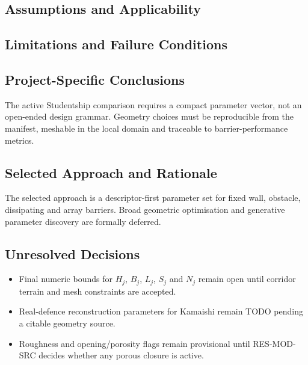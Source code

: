 
\subsection{Assumptions and Applicability}
\label{sec:res-geo-par-assumptions}


\subsection{Limitations and Failure Conditions}
\label{sec:res-geo-par-limitations}


\subsection{Project-Specific Conclusions}
\label{sec:res-geo-par-conclusions}

The active Studentship comparison requires a compact parameter vector,
not an open-ended design grammar. Geometry choices must be reproducible
from the manifest, meshable in the local domain and traceable to
barrier-performance metrics.

\subsection{Selected Approach and Rationale}
\label{sec:res-geo-par-selected-approach}

The selected approach is a descriptor-first parameter set for fixed
wall, obstacle, dissipating and array barriers. Broad geometric
optimisation and generative parameter discovery are formally deferred.

\subsection{Unresolved Decisions}
\label{sec:res-geo-par-unresolved-decisions}

\begin{itemize}
  \item Final numeric bounds for $H_j$, $B_j$, $L_j$, $S_j$ and
    $N_j$ remain open until corridor terrain and mesh constraints are
    accepted.
  \item Real-defence reconstruction parameters for Kamaishi remain
    TODO pending a citable geometry source.
  \item Roughness and opening/porosity flags remain provisional until
    RES-MOD-SRC decides whether any porous closure is active.
\end{itemize}

